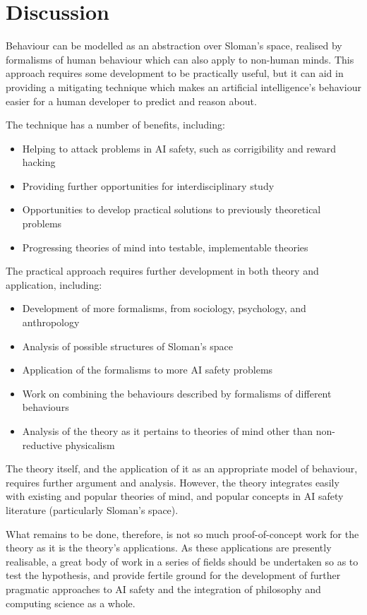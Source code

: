\section{Discussion}
Behaviour can be modelled as an abstraction over Sloman's space, realised by formalisms of human behaviour which can also apply to non-human minds. This approach requires some development to be practically useful, but it can aid in providing a mitigating technique which makes an artificial intelligence's behaviour easier for a human developer to predict and reason about.\par

The technique has a number of benefits, including:

\begin{itemize}
  \item Helping to attack problems in AI safety, such as corrigibility and reward hacking
  \item Providing further opportunities for interdisciplinary study
  \item Opportunities to develop practical solutions to previously theoretical problems
  \item Progressing theories of mind into testable, implementable theories
\end{itemize}

The practical approach requires further development in both theory and application, including:

\begin{itemize}
  \item Development of more formalisms, from sociology, psychology, and anthropology
  \item Analysis of possible structures of Sloman's space
  \item Application of the formalisms to more AI safety problems
  \item Work on combining the behaviours described by formalisms of different behaviours
  \item Analysis of the theory as it pertains to theories of mind other than non-reductive physicalism
\end{itemize}

The theory itself, and the application of it as an appropriate model of behaviour, requires further argument and analysis. However, the theory integrates easily with existing and popular theories of mind, and popular concepts in AI safety literature (particularly Sloman's space).\par

What remains to be done, therefore, is not so much proof-of-concept work for the theory as it is the theory's applications. As these applications are presently realisable, a great body of work in a series of fields should be undertaken so as to test the hypothesis, and provide fertile ground for the development of further pragmatic approaches to AI safety and the integration of philosophy and computing science as a whole.\par
